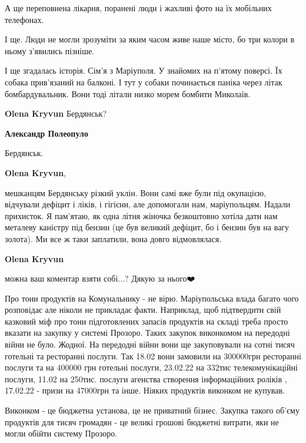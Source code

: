 А ще переповнена лікарня, поранені люди і жахливі фото на їх мобільних
телефонах.

І ще. Люди не могли зрозуміти за яким часом живе наше місто, бо три колори в
ньому з'явились пізніше.

І ще згадалась історія. Сім'я з Маріуполя. У знайомих на п'ятому поверсі. Їх
собака прив'язаний на балконі. І тут у собаки починається паніка через літак
бомбардувальник. Вони тоді літали низко морем бомбити Миколаїв.

\begin{itemize} %
\textbf{Olena Kryvun} Бердянськ?

\textbf{Александр Полеопуло}

Бердянськ.

\textbf{Olena Kryvun}, 

мешканцям Бердянську різкий уклін. Вони самі вже були під окупацією, відчували
дефіцит і ліків, і гігієни, але допомогали нам, маріупольцям. Надали прихисток.
Я пам'ятаю, як одна літня жіночка безкоштовно хотіла дати нам металеву каністру
під бензин (це був великий дефіцит, бо і бензин був на вагу золота). Ми все ж
таки заплатили, вона довго відмовлялася.

\textbf{Olena Kryvun}

можна ваш коментар взяти собі...? Дякую за нього❤️

\end{itemize} %


Про тони продуктів на Комунальнику - не вірю. Маріупольська влада багато чого
розповідає але ніколи не прикладає факти. Наприклад, щоб підтвердити свій
казковий міф про тони підготовлених запасів продуктів на складі треба просто
вказати на закупку у системі Прозоро. Таких закупок виконкомом на передодні
війни не було. Жодної. На передодні війни вони ще закуповували на сотні тисяч
готельні та ресторанні послуги. Так 18.02 вони замовили на 300000грн ресторанні
послуги та на 400000 грн готельні послуги, 23.02.22 на 332тис телекомунікаційні
послуги, 11.02 на 250тис. послуги агенства створення інформаційних роліків ,
17.02.22 - призи на 47000грн та інше. Ніяких продуктів виконком не купував.

Виконком - це бюджетна установа, це не приватний бізнес. Закупка такого об'єму
продуктів для тисяч громадян - це великі грошові бюджетні витрати, яки не могли
обійти систему Прозоро.

